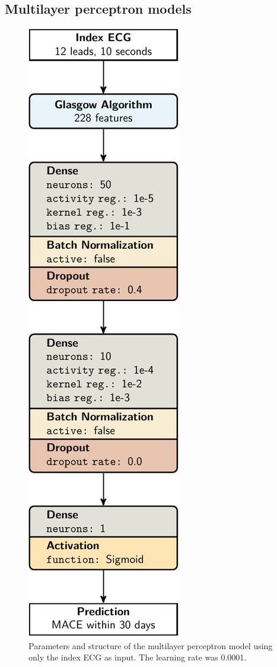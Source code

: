 \documentclass[preprint]{elsarticle}
\begin{document}
\subsection{Multilayer perceptron models}
\begin{figure}[H]
\centering
\includegraphics[scale=\modelscale,keepaspectratio]{figures/model-mlp1.pdf}
\caption{Parameters and structure of the multilayer perceptron model using only the index ECG as input. The learning rate was 0.0001.}
\end{figure}
\end{document}
